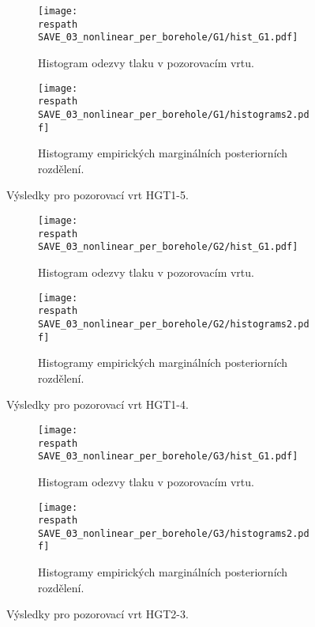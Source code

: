 \documentclass{article}
\newcommand{\respath}{results/}
\begin{document}
\cleardoublepage

\begin{figure}[htb!]
    \centering
    \begin{subfigure}[t]{0.495\textwidth}
      \texttt{[image: \\respath SAVE\_03\_nonlinear\_per\_borehole/G1/hist\_G1.pdf]}
      \caption{Histogram odezvy tlaku v pozorovacím vrtu.}
      \label{fig:hist_g1_nonlin}
    \end{subfigure}
    \begin{subfigure}[t]{0.495\textwidth}
      \texttt{[image: \\respath SAVE\_03\_nonlinear\_per\_borehole/G1/histograms2.pdf]}
      \caption{Histogramy empirických marginálních posteriorních rozdělení.}
      \label{fig:hist_g1_lin_params}
    \end{subfigure}
    \caption{Výsledky pro pozorovací vrt HGT1-5.}
    \label{fig:hist_G1}
\end{figure}

\begin{figure}[htb!]
    \centering
    \begin{subfigure}[t]{0.495\textwidth}
      \texttt{[image: \\respath SAVE\_03\_nonlinear\_per\_borehole/G2/hist\_G1.pdf]}
      \caption{Histogram odezvy tlaku v pozorovacím vrtu.}
      \label{fig:hist_g2_lin}
    \end{subfigure}
    \begin{subfigure}[t]{0.495\textwidth}
      \texttt{[image: \\respath SAVE\_03\_nonlinear\_per\_borehole/G2/histograms2.pdf]}
      \caption{Histogramy empirických marginálních posteriorních rozdělení.}
      \label{fig:hist_g2_lin_params}
    \end{subfigure}
    \caption{Výsledky pro pozorovací vrt HGT1-4.}
    \label{fig:hist_G2}
\end{figure}

\begin{figure}[htb!]
    \centering
    \begin{subfigure}[t]{0.495\textwidth}
      \texttt{[image: \\respath SAVE\_03\_nonlinear\_per\_borehole/G3/hist\_G1.pdf]}
      \caption{Histogram odezvy tlaku v pozorovacím vrtu.}
      \label{fig:hist_g3_lin}
    \end{subfigure}
    \begin{subfigure}[t]{0.495\textwidth}
      \texttt{[image: \\respath SAVE\_03\_nonlinear\_per\_borehole/G3/histograms2.pdf]}
      \caption{Histogramy empirických marginálních posteriorních rozdělení.}
      \label{fig:hist_g3_lin_params}
    \end{subfigure}
    \caption{Výsledky pro pozorovací vrt HGT2-3.}
    \label{fig:hist_G3}
\end{figure}
\end{document}
